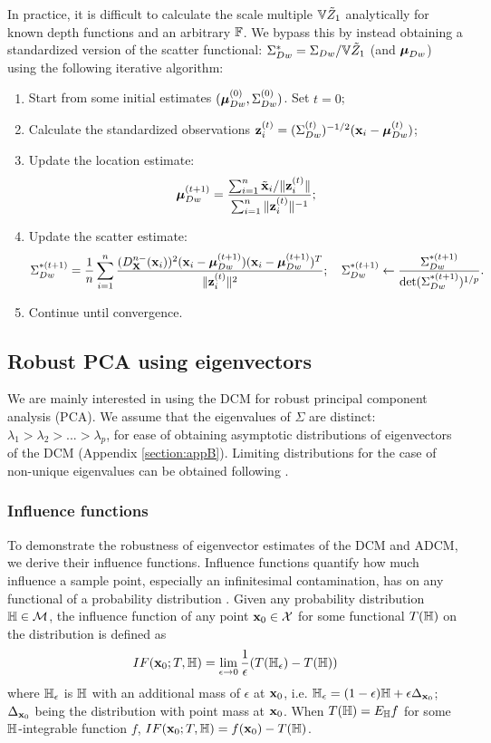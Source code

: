 In practice, it is difficult to calculate the scale multiple ${\mathbb{V}} \tilde Z_1$ analytically for known depth functions and an arbitrary ${\mathbb{F}}$. We bypass this by instead obtaining a standardized version of the scatter functional: $\Sigma_{Dw}^* = \Sigma_{Dw} / {\mathbb{V}} \tilde Z_1$ (and ${\boldsymbol{\mu}}_{Dw}$) using the following iterative algorithm:

\begin{enumerate}
\item Start from some initial estimates $({\boldsymbol{\mu}}_{Dw}^{(0)}, \Sigma_{Dw}^{(0)})$. Set $t=0$;

\item Calculate the standardized observations ${\bf{z}}_i^{(t)} = (\Sigma_{Dw}^{(t)})^{-1/2} ({\bf{x}}_i - {\boldsymbol{\mu}}_{Dw}^{(t)})$;

\item Update the location estimate:
%
$$
{\boldsymbol{\mu}}_{Dw}^{(t+1)} = \frac{\sum_{i=1}^n \tilde {{\bf{x}}}_i / \| {\bf{z}}_i^{(t)} \| }{\sum_{i=1}^n \| {\bf{z}}_i^{(t)} \|^{-1} };
$$
%
\item Update the scatter estimate:
%
$$
\Sigma_{Dw}^{*(t+1)} = \frac{1}{n} \sum_{i=1}^n \frac{(D^{n-}_{\mathbf{X}} ({\bf{x}}_i))^2 ({\bf{x}}_i - {\boldsymbol{\mu}}_{Dw}^{(t+1)})({\bf{x}}_i - {\boldsymbol{\mu}}_{Dw}^{(t+1)})^T}{\| {\bf{z}}_i^{(t)} \|^2}; \quad \Sigma_{Dw}^{*(t+1)} \leftarrow \frac{\Sigma_{Dw}^{*(t+1)}}{\text{det} (\Sigma_{Dw}^{*(t+1)})^{1/p}}.
$$
%
\item Continue until convergence.
\end{enumerate}

\subsection{Robust PCA using eigenvectors}
\label{subsec:robustPCA}
We are mainly interested in using the DCM for robust principal component analysis (PCA). We assume that the eigenvalues of $\Sigma$ are distinct: $\lambda_1 > \lambda_2 > ... > \lambda_p$, for ease of obtaining asymptotic distributions of eigenvectors of the DCM (Appendix \ref{section:appB}). Limiting distributions for the case of non-unique eigenvalues can be obtained following \cite{magyar14}.

\subsubsection{Influence functions}
To demonstrate the robustness of eigenvector estimates of the DCM and ADCM, we derive their influence functions. Influence functions quantify how much influence a sample point, especially an infinitesimal contamination, has on any functional of a probability distribution \citep{HampelBook86}. Given any probability distribution ${\mathbb{H}} \in \mathcal{M}$, the influence function of any point ${\bf{x}}_0 \in \mathcal{X}$ for some functional $T({\mathbb{H}})$ on the distribution is defined as
%
$$
IF({\bf{x}}_0; T,{\mathbb{H}}) =
\lim_{\epsilon \rightarrow 0} \frac{1}{\epsilon} (T({\mathbb{H}}_\epsilon) - T({\mathbb{H}}))
$$
%
where ${\mathbb{H}}_\epsilon$ is ${\mathbb{H}}$ with an additional mass of $\epsilon$ at ${\bf{x}}_0$, i.e. ${\mathbb{H}}_\epsilon = (1-\epsilon){\mathbb{H}} + \epsilon \Delta_{{\bf{x}}_0}$; $\Delta_{{\bf{x}}_0}$ being the distribution with point mass at ${\bf{x}}_0$. When $T({\mathbb{H}}) = E_{\mathbb{H}} f$ for some ${\mathbb{H}}$-integrable function $f$, $IF({\bf{x}}_0; T,{\mathbb{H}}) = f({\bf{x}}_0) - T({\mathbb{H}})$.

